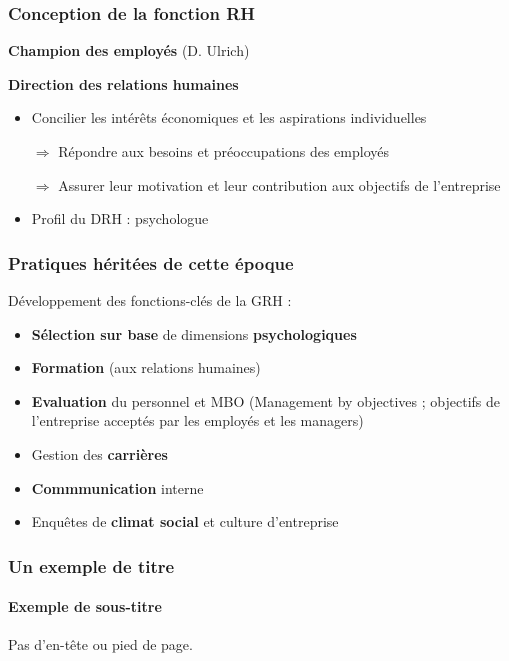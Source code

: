 \documentclass[12pt]{beamer}
\begin{document}
  \begin{frame}
    \frametitle{Conception de la fonction RH}
    
    \begin{center}
      \textbf{Champion des employés} (D. Ulrich)
      
      \textbf{\og{} Direction des relations humaines\fg{}}
      
    \end{center}
    
      \begin{itemize}
       \item Concilier les intérêts économiques et les aspirations individuelles
       
       $\Rightarrow$ Répondre aux besoins et préoccupations des employés
       
       $\Rightarrow$ Assurer leur motivation et leur contribution aux objectifs de l'entreprise
       
       \item Profil du DRH : psychologue
       
      \end{itemize}
    
  \end{frame}
  
  \begin{frame}
    \frametitle{Pratiques héritées de cette époque}
    
    Développement des fonctions-clés de la GRH :
    
    \begin{itemize}
     \item \textbf{Sélection sur base} de dimensions \textbf{psychologiques}
     \item \textbf{Formation} (aux relations humaines)
     \item \textbf{Evaluation} du personnel et MBO (Management by objectives ; objectifs de l'entreprise acceptés par les employés et les managers)
     \item Gestion des \textbf{carrières}
     \item \textbf{Commmunication} interne
     \item Enquêtes de \textbf{climat social} et culture d'entreprise
    \end{itemize}
    
  \end{frame}
  
 \begin{frame}
    \frametitle{Un exemple de titre}
      \framesubtitle{Exemple de sous-titre}
 \end{frame}
 
 \begin{frame}[plain]
  Pas d'en-tête ou pied de page.
 \end{frame}
\end{document}

